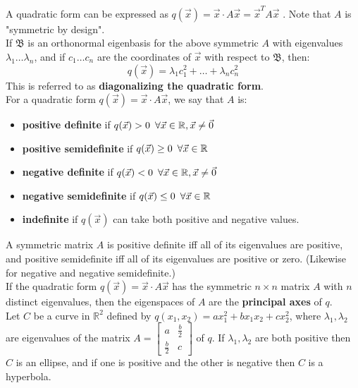 \documentclass[]{scrartcl}
\begin{document}
	A quadratic form can be expressed as $q(\vec{x}) = \vec{x} \cdot A\vec{x} = \vec{x}^T A\vec{x}$ . Note that $A$ is "symmetric by design".\\
	
	If $\mathfrak{B}$ is an orthonormal eigenbasis for the above symmetric $A$ with eigenvalues $\lambda_1 \ldots \lambda_n$, and if $c_1 \ldots c_n$ are the coordinates of $\vec{x}$ with respect to $\mathfrak{B}$, then:
	$$
	q(\vec{x}) = \lambda_1 c^2_1 + \ldots + \lambda_n c^2_n
	$$
	This is referred to as \textbf{diagonalizing the quadratic form}.\\
	
	For a quadratic form $q(\vec{x}) = \vec{x} \cdot A\vec{x}$, we say that $A$ is:
	\begin{itemize}
		\item \textbf{positive definite} if $q(\vec{x}) > 0 \enskip \forall \vec{x} \in \mathbb{R}, \vec{x} \neq \vec{0}$
		\item \textbf{positive semidefinite} if $q(\vec{x}) \geq 0 \enskip \forall \vec{x} \in \mathbb{R}$
		\item \textbf{negative definite} if $q(\vec{x}) < 0 \enskip \forall \vec{x} \in \mathbb{R}, \vec{x} \neq \vec{0}$
		\item \textbf{negative semidefinite} if $q(\vec{x}) \leq 0 \enskip \forall \vec{x} \in \mathbb{R}$
		\item \textbf{indefinite} if $q(\vec{x})$ can take both positive and negative values.
	\end{itemize}

	A symmetric matrix $A$ is positive definite iff all of its eigenvalues are positive, and positive semidefinite iff all of its eigenvalues are positive or zero. (Likewise for negative and negative semidefinite.) \\
	
	If the quadratic form $q(\vec{x}) = \vec{x} \cdot A\vec{x}$ has the symmetric $n \times n$ matrix $A$ with $n$ distinct eigenvalues, then the eigenspaces of $A$ are the \textbf{principal axes} of $q$.\\
	
	Let $C$ be a curve in $\mathbb{R}^2$ defined by $q(x_1, x_2) = ax^2_1 + bx_1x_2 + cx^2_2$, where $\lambda_1, \lambda_2$ are eigenvalues of the matrix $A = 
	\begin{bmatrix} a & \frac{b}{2}\\ \frac{b}{2} & c \end{bmatrix}$ of $q$. 
	If $\lambda_1, \lambda_2$ are both positive then $C$ is an ellipse, and if one is positive and the other is negative then $C$ is a hyperbola.\\
	
\end{document}

